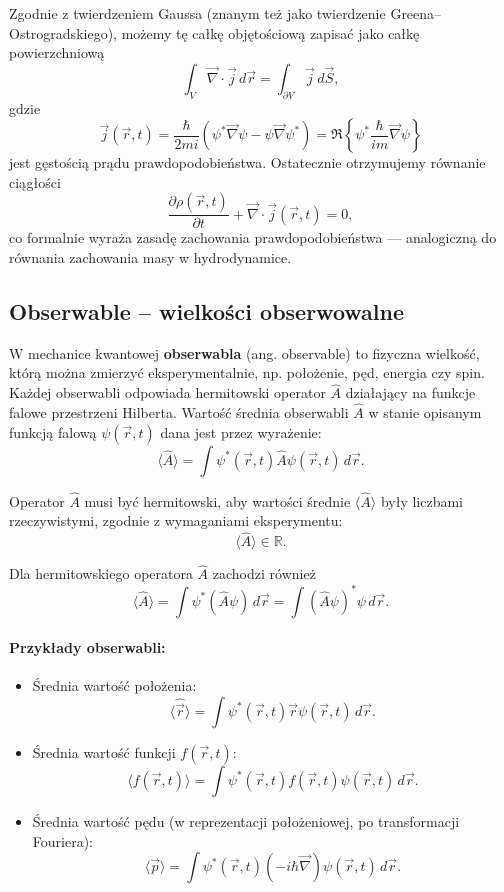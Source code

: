 Zgodnie z twierdzeniem Gaussa (znanym też jako twierdzenie Greena–Ostrogradskiego), możemy tę całkę objętościową zapisać jako całkę powierzchniową
$$
\int_V \vec{\nabla} \cdot \vec{j} \, d\vec{r} = \int_{\partial V} \vec{j} \, d\vec{S},
$$
gdzie
$$
\vec{j}(\vec{r}, t) = \frac{\hbar}{2mi} \left( \psi^* \vec{\nabla} \psi - \psi \vec{\nabla} \psi^* \right) = \Re \left\{ \psi^* \frac{\hbar}{im} \vec{\nabla} \psi \right\}
$$
jest gęstością prądu prawdopodobieństwa. Ostatecznie otrzymujemy równanie ciągłości
$$
\frac{\partial \rho(\vec{r}, t)}{\partial t} + \vec{\nabla} \cdot \vec{j}(\vec{r}, t) = 0,
$$
co formalnie wyraża zasadę zachowania prawdopodobieństwa — analogiczną do równania zachowania masy w hydrodynamice.


\subsection{Obserwable -- wielkości obserwowalne}

W mechanice kwantowej \textbf{obserwabla} (ang. observable) to fizyczna wielkość, którą można zmierzyć eksperymentalnie, np. położenie, pęd, energia czy spin. Każdej obserwabli odpowiada hermitowski operator $\hat{A}$ działający na funkcje falowe przestrzeni Hilberta. Wartość średnia obserwabli $\hat{A}$ w stanie opisanym funkcją falową $\psi(\vec{r}, t)$ dana jest przez wyrażenie:
$$
\langle \hat{A} \rangle = \int \psi^*(\vec{r}, t) \hat{A} \psi(\vec{r}, t) \, d\vec{r}.
$$

Operator $\hat{A}$ musi być hermitowski, aby wartości średnie $\langle \hat{A} \rangle$ były liczbami rzeczywistymi, zgodnie z wymaganiami eksperymentu:
$$
\langle \hat{A} \rangle \in \mathbb{R}.
$$

Dla hermitowskiego operatora $\hat{A}$ zachodzi również
$$
\langle \hat{A} \rangle = \int \psi^* (\hat{A} \psi) \, d\vec{r} = \int (\hat{A} \psi)^* \psi \, d\vec{r}.
$$

\paragraph{Przykłady obserwabli:}

\begin{itemize}
    \item Średnia wartość położenia:
    $$
    \langle \hat{\vec{r}} \rangle = \int \psi^*(\vec{r}, t) \vec{r} \psi(\vec{r}, t) \, d\vec{r}.
    $$

    \item Średnia wartość funkcji $f(\vec{r}, t)$:
    $$
    \langle f(\vec{r}, t) \rangle = \int \psi^*(\vec{r}, t) f(\vec{r}, t) \psi(\vec{r}, t) \, d\vec{r}.
    $$

    \item Średnia wartość pędu (w reprezentacji położeniowej, po transformacji Fouriera):
    $$
    \langle \vec{p} \rangle = \int \psi^*(\vec{r}, t) \left( -i\hbar \vec{\nabla} \right) \psi(\vec{r}, t) \, d\vec{r}.
    $$
\end{itemize}

